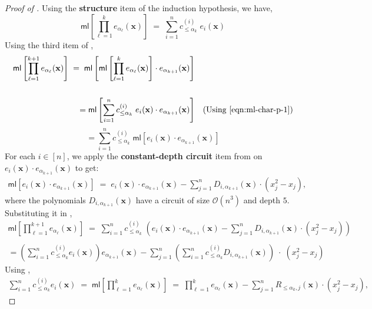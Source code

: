 \documentclass[10pt,a4paper]{amsart}
\newcommand{\bigO}{\mathcal{O}}
\newcommand{\brac}[1]{\left[ #1 \right]}
\newcommand{\ml}{\mathsf{ml}}
\newcommand{\paren}[1]{\left( #1 \right)}
\begin{document}
\begin{proof}[Proof of ]
\noindent
Using the \textbf{structure} item of the induction hypothesis, we have,
\begin{equation}\label{eqn:ml-char-p-1}
    \ml\brac{\prod_{\ell = 1}^{k} e_{\alpha_{\ell}}(\mathbf{x})} \; = \; \sum_{i=1}^{n} c_{\leq \alpha_{k}}^{(i)} \; e_{i}(\mathbf{x})
\end{equation}
Using the third item of ,
\begin{align*}
    \ml\brac{\prod_{\ell = 1}^{k+1} e_{\alpha_{\ell}}(\mathbf{x})} \; = \; \ml\brac{\ml\brac{\prod_{\ell = 1}^{k} e_{\alpha_{\ell}}(\mathbf{x})} \cdot e_{\alpha_{k+1}}(\mathbf{x})} \\ \\
    = \ml\brac{\sum_{i = 1}^{n} c_{\leq \alpha_{k}}^{(i)} \; e_{i}(\mathbf{x}) \cdot e_{\alpha_{k+1}}(\mathbf{x}) } && (\text{Using \Cref{eqn:ml-char-p-1}}) 
\end{align*}
\begin{equation}\label{eqn:partial-ml-8}
    = \sum_{i = 1}^{n} c_{\leq \alpha_{k}}^{(i)} \; \ml[e_{i}(\mathbf{x}) \cdot e_{\alpha_{k+1}}(\mathbf{x}) ]
\end{equation}
For each $i \in [n]$, we apply the \textbf{constant-depth circuit} item from  on $e_{i}(\mathbf{x}) \cdot e_{\alpha_{k+1}}(\mathbf{x})$ to get:
\begin{align*}
    \ml[e_{i}(\mathbf{x}) \cdot e_{\alpha_{k+1}}(\mathbf{x})] \; = \; e_{i}(\mathbf{x}) \cdot e_{\alpha_{k+1}}(\mathbf{x}) - \sum_{j=1}^{n} D_{i,\alpha_{k+1}}(\mathbf{x}) \cdot (x_{j}^{2} - x_{j}),
\end{align*}
where the polynomials $D_{i,\alpha_{k+1}}(\mathbf{x})$ have a circuit of size $\bigO(n^{3})$ and depth $5$. Substituting it in ,
\begin{align*}
    \ml\brac{\prod_{\ell = 1}^{k+1} e_{\alpha_{\ell}}(\mathbf{x})} \; = \; \sum_{i=1}^{n} c_{\leq \alpha_{k}}^{(i)} \; \paren{e_{i}(\mathbf{x}) \cdot e_{\alpha_{k+1}}(\mathbf{x}) - \sum_{j=1}^{n} D_{i,\alpha_{k+1}}(\mathbf{x}) \cdot (x_{j}^{2} - x_{j})} \\ \\
    = \paren{\sum_{i = 1}^{n} c_{\leq \alpha_{k}}^{(i)} e_{i}(\mathbf{x}) } e_{\alpha_{k+1}}(\mathbf{x}) - \sum_{j=1}^{n} \paren{\sum_{i = 1}^{n} c_{\leq \alpha_{k}}^{(i)}  D_{i,\alpha_{k+1}}(\mathbf{x})} \; \cdot \; (x_{j}^{2} - x_{j})
\end{align*}
Using ,
\begin{align*}
    \sum_{i = 1}^{n} c_{\leq \alpha_{k}}^{(i)} e_{i}(\mathbf{x}) \; = \; \ml\brac{\prod_{\ell = 1}^{k} e_{\alpha_{\ell}}(\mathbf{x})} \; = \; \prod_{\ell = 1}^{k} e_{\alpha_{\ell}}(\mathbf{x}) - \sum_{j=1}^{n} R_{\leq \alpha_{k}, j}(\mathbf{x}) \cdot (x_{j}^{2} - x_{j}),

\end{align*}
\end{proof}
\end{document}
